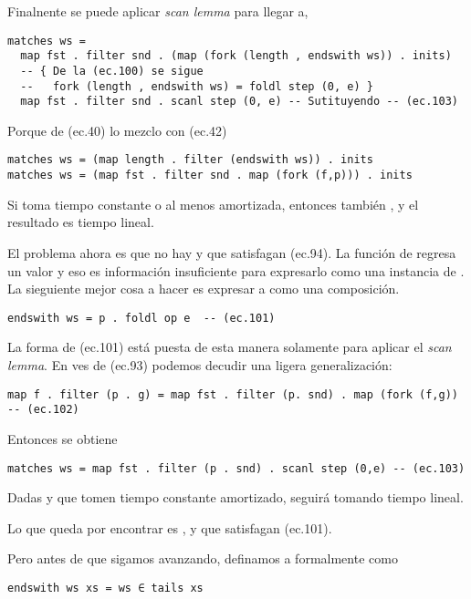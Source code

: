 Finalnente se puede aplicar \textit{scan lemma} para llegar a,
\begin{verbatim}
matches ws =
  map fst . filter snd . (map (fork (length , endswith ws)) . inits)
  -- { De la (ec.100) se sigue 
  --   fork (length , endswith ws) = foldl step (0, e) }
  map fst . filter snd . scanl step (0, e) -- Sutituyendo -- (ec.103)
\end{verbatim}

Porque de (ec.40) lo mezclo con (ec.42)
\begin{verbatim}
matches ws = (map length . filter (endswith ws)) . inits
matches ws = (map fst . filter snd . map (fork (f,p))) . inits
\end{verbatim}

Si  toma tiempo constante o al menos amortizada, entonces también , y el resultado es tiempo lineal.

El problema ahora es que no hay  y  que satisfagan (ec.94). La función de 
regresa un valor  y eso es información insuficiente para expresarlo como una instancia de
.
La sieguiente mejor cosa a hacer es expresar a  como una composición.

\begin{verbatim}
endswith ws = p . foldl op e  -- (ec.101)
\end{verbatim}

La forma de (ec.101) está puesta de esta manera solamente para aplicar el \textit{scan lemma}. 
En ves de (ec.93) podemos decudir una ligera generalización:
\begin{verbatim}
map f . filter (p . g) = map fst . filter (p. snd) . map (fork (f,g))  -- (ec.102)
\end{verbatim}

Entonces se obtiene
\begin{verbatim}
matches ws = map fst . filter (p . snd) . scanl step (0,e) -- (ec.103)
\end{verbatim} 

Dadas  y  que tomen tiempo constante amortizado,  seguirá tomando tiempo lineal.

Lo que queda por encontrar es ,  y  que satisfagan (ec.101).

Pero antes de que sigamos avanzando, definamos a  formalmente como
\begin{verbatim}
endswith ws xs = ws ∈ tails xs
\end{verbatim}


